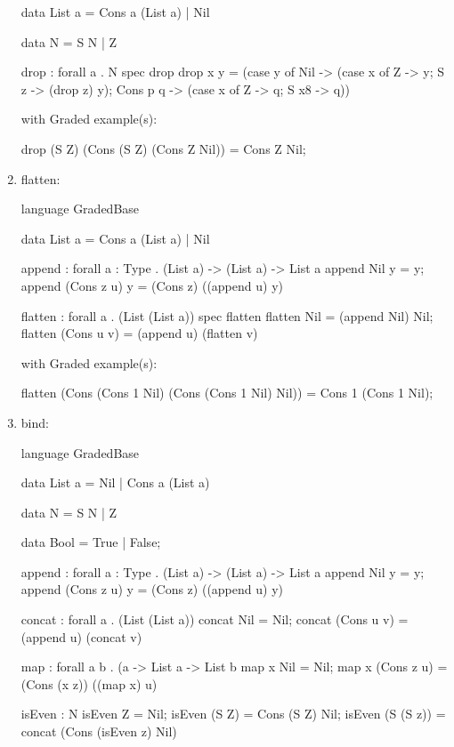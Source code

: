 \begin{enumerate}
\begin{granule}
data List a = Cons a (List a) | Nil
    
data N = S N | Z
        
drop : forall a . N %
spec 
    drop %
drop x y = 
    (case y of
        Nil -> 
    (case x of
        Z -> y;
        S z -> (drop z) y);
        Cons p q -> 
    (case x of
        Z -> q;
        S x8 -> q))
\end{granule}
with Graded example(s): 
\begin{granule}
drop (S Z) (Cons (S Z) (Cons Z Nil)) = Cons Z Nil; 
\end{granule}
\item flatten: 
\begin{granule}
language GradedBase 

data List a = Cons a (List a) | Nil
    
append : forall {a : Type} 
       . (List a) %
       -> (List a) %
       ->  List a
append Nil y = y;
append (Cons z u) y = (Cons z) ((append u) y)
    
flatten : forall a . (List (List a)) %
spec 
    flatten %
flatten Nil = (append Nil) Nil;
flatten (Cons u v) = (append u) (flatten v)
\end{granule}
with Graded example(s):
\begin{granule}
flatten (Cons (Cons 1 Nil) (Cons (Cons 1 Nil) Nil)) = Cons 1 (Cons 1 Nil);
\end{granule}
\item bind: 
\begin{granule}
language GradedBase

data List a = Nil | Cons a (List a) 

data N = S N | Z

data Bool = True | False; 

append : forall {a : Type} 
       . (List a) %
       -> (List a) %
       ->  List a
append Nil y = y;
append (Cons z u) y = (Cons z) ((append u) y)

concat : forall a . (List (List a)) %
concat Nil = Nil;
concat (Cons u v) = (append u) (concat v)

map : forall a b 
    . (a %
    -> List a %
    -> List b
map x Nil = Nil;
map x (Cons z u) = (Cons (x z)) ((map x) u)

isEven : N %
isEven Z = Nil;
isEven (S Z) = Cons (S Z) Nil;
isEven (S (S z)) = concat (Cons (isEven z) Nil)


\end{granule}
\end{enumerate}
